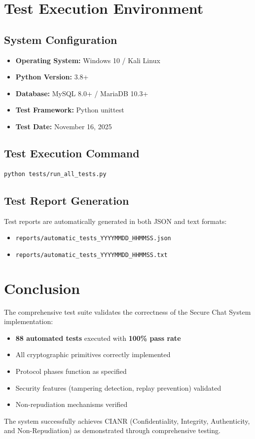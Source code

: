 \documentclass[runningheads]{llncs}
\begin{document}
\section{Test Execution Environment}

\subsection{System Configuration}

\begin{itemize}
    \item \textbf{Operating System:} Windows 10 / Kali Linux
    \item \textbf{Python Version:} 3.8+
    \item \textbf{Database:} MySQL 8.0+ / MariaDB 10.3+
    \item \textbf{Test Framework:} Python unittest
    \item \textbf{Test Date:} November 16, 2025
\end{itemize}

\subsection{Test Execution Command}

\begin{lstlisting}[language=bash]
python tests/run_all_tests.py
\end{lstlisting}

\subsection{Test Report Generation}

Test reports are automatically generated in both JSON and text formats:
\begin{itemize}
    \item \texttt{reports/automatic\_tests\_YYYYMMDD\_HHMMSS.json}
    \item \texttt{reports/automatic\_tests\_YYYYMMDD\_HHMMSS.txt}
\end{itemize}

\section{Conclusion}

The comprehensive test suite validates the correctness of the Secure Chat System implementation:

\begin{itemize}
    \item \textbf{88 automated tests} executed with \textbf{100\% pass rate}
    \item All cryptographic primitives correctly implemented
    \item Protocol phases function as specified
    \item Security features (tampering detection, replay prevention) validated
    \item Non-repudiation mechanisms verified
\end{itemize}

The system successfully achieves CIANR (Confidentiality, Integrity, Authenticity, and Non-Repudiation) as demonstrated through comprehensive testing.
\end{document}
